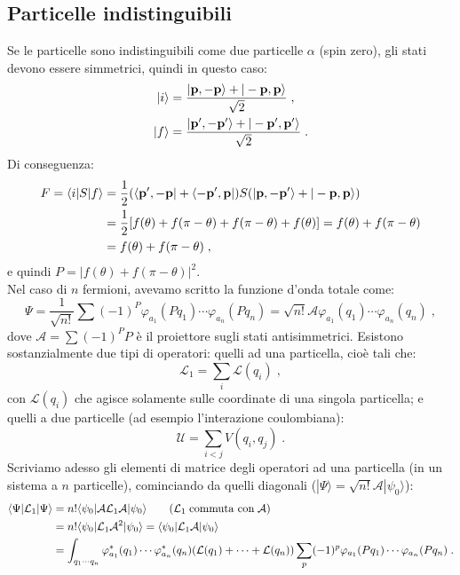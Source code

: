 \documentclass[10pt,a4paper]{report}
\theoremstyle{definition}
\newcommand{\lag}{\mathcal{L}}
\numberwithin{equation}{section}
\newcommand{\bra}{\langle}
\newcommand{\ket}{\rangle}
\begin{document}
\subsection{Particelle indistinguibili}
Se le particelle sono indistinguibili come due particelle $\alpha$ (spin zero), gli stati devono essere simmetrici, quindi in questo caso:
\begin{align}
|i\ket &= \frac{|\mathbf{p},-\mathbf{p}\ket+|-\mathbf{p},\mathbf{p}\ket}{\sqrt{2}}\;, \notag \\
|f\ket &= \frac{|\mathbf{p}',-\mathbf{p}'\ket+|-\mathbf{p}',\mathbf{p}'\ket}{\sqrt{2}}\;.
\end{align}
Di conseguenza:
\begin{align}
F = \bra i|S|f\ket &= \frac{1}{2}(\bra\mathbf{p}',-\mathbf{p}|+\bra -\mathbf{p}',\mathbf{p}|)S(|\mathbf{p},-\mathbf{p}'\ket+|-\mathbf{p},\mathbf{p}\ket) \notag \\
&=\frac{1}{2}[f(\theta)+f(\pi-\theta)+f(\pi-\theta)+f(\theta)]=f(\theta)+f(\pi-\theta)  \notag \\
&= f(\theta)+f(\pi-\theta)\;,
\end{align}
e quindi $P=|f(\theta)+f(\pi-\theta)|^2$. \\
Nel caso di $n$ fermioni, avevamo scritto la funzione d'onda totale come:
$$
\Psi=\frac{1}{\sqrt{n!}}\sum (-1)^P\varphi_{a_1}(Pq_1)\cdots\varphi_{a_n}(Pq_n)=\sqrt{n!}\mathcal{A}\varphi_{a_1}(q_1)\cdots\varphi_{a_n}(q_n)\;,
$$
dove $\mathcal{A}=\sum (-1)^PP$ è il proiettore sugli stati antisimmetrici. Esistono sostanzialmente due tipi di operatori: quelli ad una particella, cioè tali che:
\begin{equation}
\lag_1=\sum_i\lag(q_i)\;,
\end{equation}
con $\lag(q_i)$ che agisce solamente sulle coordinate di una singola particella; e quelli a due particelle (ad esempio l'interazione coulombiana):
\begin{equation}
\mathcal{U}=\sum_{i<j}V(q_i,q_j)\;.
\end{equation}
Scriviamo adesso gli elementi di matrice degli operatori ad una particella (in un sistema a $n$ particelle), cominciando da quelli diagonali ($|\Psi\ket=\sqrt{n!}\mathcal{A}|\psi_0\ket$):
\begin{align}
\bra\Psi|\lag_1|\Psi\ket &= n!\bra \psi_0|\mathcal{A}\lag_1\mathcal{A}|\psi_0\ket \qquad (\lag_1\;\mbox{commuta con}\;\mathcal{A}) \notag \\
&= n!\bra\psi_0|\lag_1\mathcal{A}^2|\psi_0\ket=\bra\psi_0|\lag_1\mathcal{A}|\psi_0\ket \notag \\
&= \int_{q_1\cdots q_n} \varphi_{a_1}^*(q_1)\cdots\varphi_{a_n}^*(q_n)(\lag(q_1)+\cdots+\lag(q_n))\sum_p(-1)^p\varphi_{a_1}(Pq_1)\cdots\varphi_{a_n}(Pq_n)\;.
\end{align}
\end{document}
